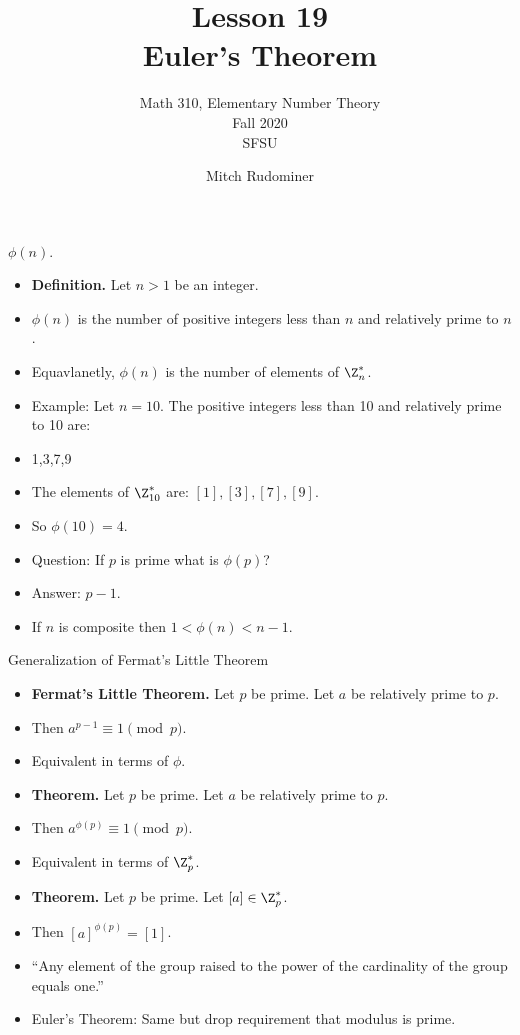 \documentclass{beamer}
\title{Lesson 19 \\ Euler's Theorem}
\subtitle{Math 310, Elementary Number Theory \\ Fall 2020 \\ SFSU}
\author{Mitch Rudominer}
\date{}
\begin{document}
\begin{frame}
  \titlepage
\end{frame}

\begin{frame}{$\phi(n)$.}

\begin{itemize}
  \item \textbf{Definition.} Let $n>1$ be an integer.
  \item $\phi(n)$ is the number of positive integers less than $n$ and relatively prime to $n$.
  \item Equavlanetly, $\phi(n)$ is the number of elements of $\Z_n^*$.
  \item Example: Let $n=10$. The positive integers less than 10 and relatively prime to 10 are:
  \item 1,3,7,9
  \item The elements of $\Z_{10}^*$ are: $[1], [3], [7], [9]$.
  \item So $\phi(10) = 4$.
  \item Question: If $p$ is prime what is $\phi(p)$?
  \item Answer: $p-1$.
  \item If $n$ is composite then $1<\phi(n)<n-1$.
\end{itemize}

\end{frame}

\begin{frame}{Generalization of Fermat's Little Theorem}

\begin{itemize}
  \item \textbf{Fermat's Little Theorem.} Let $p$ be prime. Let $a$ be relatively prime to $p$.
  \item Then $a^{p-1} \equiv 1 \pmod p$.
  \item Equivalent in terms of $\phi$.
  \item \textbf{Theorem.} Let $p$ be prime. Let $a$ be relatively prime to $p$.
  \item Then $a^{\phi(p)} \equiv 1 \pmod p$.
  \item Equivalent in terms of $\Z_p^*$.
  \item \textbf{Theorem.} Let $p$ be prime. Let $[a]\in\Z_p^*$.
  \item Then $[a]^{\phi(p)} = [1]$.
  \item ``Any element of the group raised to the power of the cardinality of the group equals one.''
  \item Euler's Theorem: Same but drop requirement that modulus is prime.
\end{itemize}

\end{frame}
\end{document}
